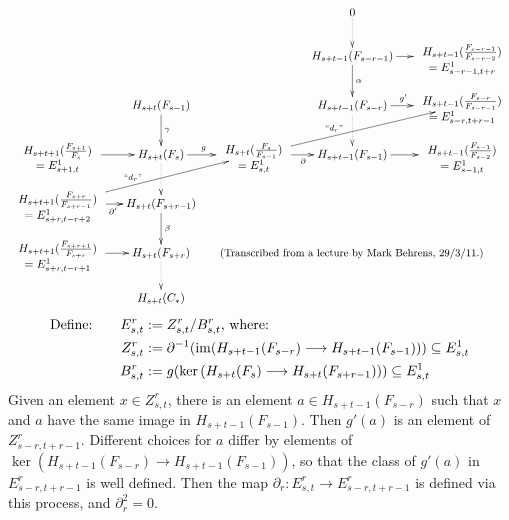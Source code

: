 \documentclass[11pt]{article}
\begin{document}
\[\xymatrix@C=.5cm@R=.7cm{
&&&0\ar@{.>}[d]&\\
&&&H_{s+t-1}(F_{s-r-1})\ar[d]^\alpha \ar[r]&\theexp{s+t-1}{s-r-1}{s-r-2}{s-r-1,t+r}\\
&H_{s+t}(F_{s-1})\ar[d]^\gamma&&H_{s+t-1}(F_{s-r})\ar@{.>}[d] \ar[r]^{g'\ \ }&\theexp{s+t-1}{s-r}{s-r-1}{s-r,t+r-1}\\
\theexp{s+t+1}{s+1}{s}{s+1,t}\ar[r]&H_{s+t}(F_s)\ar[r]^{g\ \ }\ar@{.>}[d]&
\theexp{s+t}{s}{s-1}{s,t}\ar[r]_\partial\ar[rru]^(.4){\text{``$d_r$''}}
&H_{s+t-1}(F_{s-1}) \ar[r]&\theexp{s+t-1}{s-1}{s-2}{s-1,t}\\
\theexp{s+t+1}{s+r}{s+r-1}{s+r,t-r+2}\ar[r]_{\ \ \partial'}\ar[rru]^(.4){\text{``$d_r$''}}&H_{s+t}(F_{s+r-1})\ar[d]^{\beta}\\
\theexp{s+t+1}{s+r+1}{s+r}{s+r,t-r+1}\ar[r]&H_{s+t}(F_{s+r})\ar@{.>}[d]
&&\makebox[0cm]{
{\small {(Transcribed from a lecture  by Mark Behrens, 29/3/11.)}}
}
\\
&H_{s+t}(C_*)
}\]
\begin{alignat*}{2}
\text{Define:\qquad } E^r_{s,t}&:=Z^r_{s,t}/B^r_{s,t}\text{, where:}\\
Z^r_{s,t}&:=\partial^{-1}(\operatorname{im}(H_{s+t-1}(F_{s-r})\longrightarrow H_{s+t-1}(F_{s-1})))\subseteq E^1_{s,t}\\
B^r_{s,t}&:=g(\textup{ker}\,(H_{s+t}(F_{s})\longrightarrow H_{s+t}(F_{s+r-1})))\subseteq E^1_{s,t}
\end{alignat*}
Given an element $x\in Z^r_{s,t}$, there is an element $a\in H_{s+t-1}(F_{s-r})$ such that $x$ and $a$ have the same image in $H_{s+t-1}(F_{s-1})$. Then $g'(a)$ is an element of $Z^r_{s-r,t+r-1}$. Different choices for $a$ differ by elements of $\ker(H_{s+t-1}(F_{s-r})\to H_{s+t-1}(F_{s-1}))$, so that the class of $g'(a)$ in $E^r_{s-r,t+r-1}$ is well defined. Then the map $\partial_r:E^r_{s,t}\to E^r_{s-r,t+r-1}$ is defined via this process, and $\partial_r^2=0$.
\end{document}
